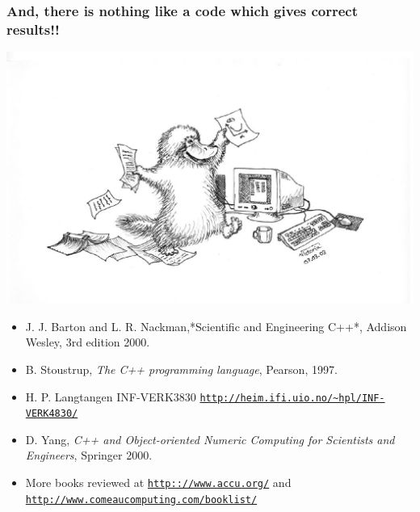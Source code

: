 \documentclass{beamer}
\begin{document}
\begin{frame}
\frametitle{And, there is nothing like a code which gives correct results!!}

\centerline{\includegraphics[width=0.6\linewidth]{fig-intro/Nebbdyr2.pdf}}



\begin{itemize}
 \item J. J. Barton and L. R. Nackman,*Scientific and Engineering C++*, Addison Wesley, 3rd edition 2000.

 \item B. Stoustrup, \emph{The C++ programming language}, Pearson, 1997.

 \item H. P. Langtangen INF-VERK3830 \href{{http://heim.ifi.uio.no/~hpl/INF-VERK4830/}}{\nolinkurl{http://heim.ifi.uio.no/~hpl/INF-VERK4830/}}

 \item D. Yang, \emph{C++ and Object-oriented Numeric Computing for Scientists and Engineers}, Springer 2000.

 \item More books reviewed at \href{{http:://www.accu.org/}}{\nolinkurl{http:://www.accu.org/}} and \href{{http://www.comeaucomputing.com/booklist/}}{\nolinkurl{http://www.comeaucomputing.com/booklist/}}
\end{itemize}

\noindent
\end{frame}
\end{document}
